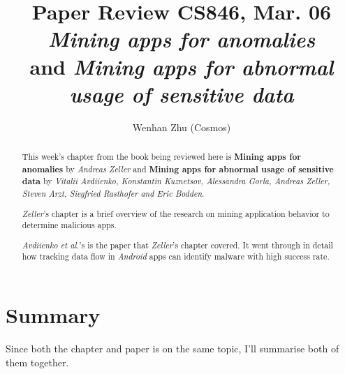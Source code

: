 \documentclass[sigconf]{acmart}
\begin{document}
\title{Paper Review CS846, Mar. 06\\
{\it Mining apps for anomalies} \\
and {\it Mining apps for abnormal usage of sensitive data}
}

\author{Wenhan Zhu (Cosmos)}

\begin{abstract}

    This week's chapter from the book being reviewed here is {\bf Mining apps for anomalies} by {\it Andreas Zeller} and {\bf Mining apps for abnormal usage of sensitive data} by {\it Vitalii Avdiienko, Konstantin Kuznetsov, Alessandra Gorla, Andreas Zeller, Steven Arzt, Siegfried Rasthofer and Eric Bodden}.

    {\it Zeller}'s chapter is a brief overview of the research on mining application behavior to determine malicious apps. 

    {\it Avdiienko et al.}'s is the paper that {\it Zeller}'s chapter covered. It went through in detail how tracking data flow in {\it Android} apps can identify malware with high success rate.

\end{abstract}


\maketitle

\section{Summary}

Since both the chapter and paper is on the same topic, I'll summarise both of them together. 
\end{document}
